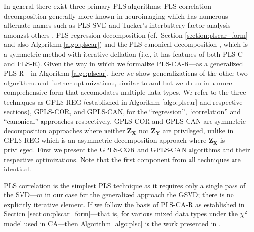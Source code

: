 \documentclass[12pt]{article}
\begin{document}
In general there exist three primary PLS algorithms: PLS correlation
decomposition \citep{bookstein1994partial, ketterlinus1989partial}
generally more known in neuroimaging
\citep{mcintosh_spatial_1996, mcintosh_partial_2004, krishnan_partial_2011}
which has numerous alternate names such as PLS-SVD and Tucker's
interbattery factor analysis \citep{tucker_inter-battery_1958} amongst
others \citep[see also][]{beaton_partial_2016}, PLS regression
decomposition (cf.~Section \ref{section:plscar_form} and also Algorithm
\ref{algo:plscar}) and the PLS canonical decomposition
\citep{tenenhaus_regression_1998, wegelin2000survey}, which is a
symmetric method with iterative deflation (i.e., it has features of both
PLS-C and PLS-R). Given the way in which we formalize PLS-CA-R---as a
generalized PLS-R---in Algorithm \ref{algo:plscar}, here we show
generalizations of the other two algorithms and further optimizations,
similar to \citet{indahl2009canonical} and \citet{borga_unified_1992}
but we do so in a more comprehensive form that accomodates multiple data
types. We refer to the three techniques as GPLS-REG (established in
Algorithm \ref{algo:plscar} and respective sections), GPLS-COR, and
GPLS-CAN, for the ``regression'', ``correlation'' and ``canonical''
approaches respectively. GPLS-COR and GPLS-CAN are symmetric
decomposition approaches where neither \({\mathbf Z}_{{\mathbf X}}\) nor
\({\mathbf Z}_{{\mathbf Y}}\) are privileged, unlike in GPLS-REG which
is an asymmetric decomposition approach where
\({\mathbf Z}_{{\mathbf X}}\) is privileged. First we present the
GPLS-COR and GPLS-CAN algorithms and their respective optimizations.
Note that the first component from all techniques are identical.

PLS correlation is the simplest PLS technique as it requires only a
single pass of the SVD---or in our case for the generalized approach the
GSVD; there is no explicitly iterative element. If we follow the basis
of PLS-CA-R as established in Section \ref{section:plscar_form}---that
is, for various mixed data types under the \(\chi^2\) model used in
CA---then Algorithm \ref{algo:plsc} is the work presented in
\citep{beaton_partial_2016}.
\end{document}
